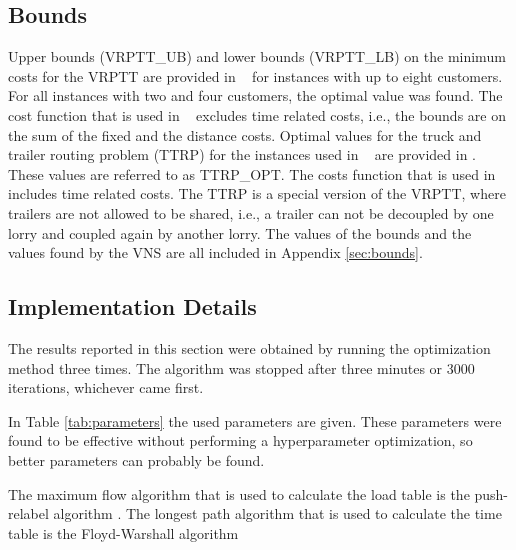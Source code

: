 \subsection{Bounds}
Upper bounds (VRPTT\_UB) and lower bounds (VRPTT\_LB)  on the minimum costs for the VRPTT are provided in ~\cite{drexl2014bandc} for instances with up to eight customers.
For all instances with two and four customers, the optimal value was found.
 The cost function that is used in ~\cite{drexl2014bandc} excludes time related costs, i.e., the bounds are on the sum of the fixed and the distance costs.
Optimal values for the truck and trailer routing problem (TTRP) for the instances used in ~\cite{drexl2014bandc} are provided in \cite{drexl2011branch}. These values are referred to as TTRP\_OPT. The costs function that is used in \cite{drexl2011branch} includes time related costs.  The TTRP is a special version of the VRPTT, where trailers are not allowed to be shared, i.e., a trailer can not be decoupled by one lorry and coupled again by another lorry.
%
The values of the bounds and the values found by the VNS are all included in Appendix \ref{sec:bounds}.


\subsection{Implementation Details }







The results reported in this section were obtained by running the optimization method three times.
The algorithm was stopped after three minutes or 3000 iterations, whichever came first.

In Table \ref{tab:parameters}  the used parameters are given.
These parameters were found to be effective without performing a hyperparameter optimization, so better parameters can probably be found.


The maximum flow algorithm that is used to calculate the load table is the push-relabel algorithm   \cite{goldberg1988new}.
The longest path algorithm that is used to calculate the time table is the Floyd-Warshall algorithm \cite{Floyd}


